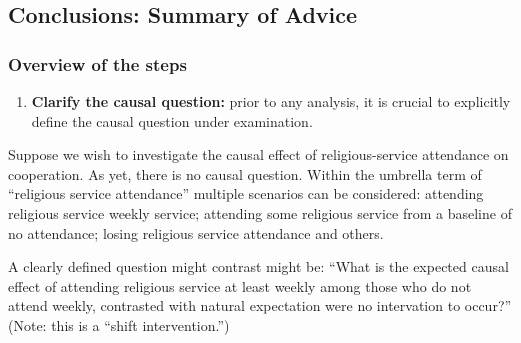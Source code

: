 \documentclass[
  singlecolumn]{article}
\providecommand{\tightlist}{%
  \setlength{\itemsep}{0pt}\setlength{\parskip}{0pt}}\usepackage{longtable,booktabs,array}
\begin{document}
\subsection{Conclusions: Summary of
Advice}\label{conclusions-summary-of-advice}

\subsubsection{Overview of the steps}\label{overview-of-the-steps}

\begin{enumerate}
\def\labelenumi{\arabic{enumi}.}
\tightlist
\item
  \textbf{Clarify the causal question:} prior to any analysis, it is
  crucial to explicitly define the causal question under examination.
\end{enumerate}

Suppose we wish to investigate the causal effect of religious-service
attendance on cooperation. As yet, there is no causal question. Within
the umbrella term of ``religious service attendance'' multiple scenarios
can be considered: attending religious service weekly service; attending
some religious service from a baseline of no attendance; losing
religious service attendance and others.

A clearly defined question might contrast might be: ``What is the
expected causal effect of attending religious service at least weekly
among those who do not attend weekly, contrasted with natural
expectation were no intervation to occur?'' (Note: this is a ``shift
intervention.'')
\end{document}
